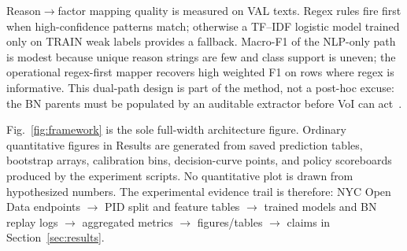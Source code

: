Reason$\rightarrow$factor mapping quality is measured on VAL texts. Regex rules fire first when high-confidence patterns match; otherwise a TF--IDF logistic model trained only on TRAIN weak labels provides a fallback. Macro-F1 of the NLP-only path is modest because unique reason strings are few and class support is uneven; the operational regex-first mapper recovers high weighted F1 on rows where regex is informative. This dual-path design is part of the method, not a post-hoc excuse: the BN parents must be populated by an auditable extractor before VoI can act~\cite{Onisko2001,Woldesenbet2016}.

Fig.~\ref{fig:framework} is the sole full-width architecture figure. Ordinary quantitative figures in Results are generated from saved prediction tables, bootstrap arrays, calibration bins, decision-curve points, and policy scoreboards produced by the experiment scripts. No quantitative plot is drawn from hypothesized numbers. The experimental evidence trail is therefore: NYC Open Data endpoints $\rightarrow$ PID split and feature tables $\rightarrow$ trained models and BN replay logs $\rightarrow$ aggregated metrics $\rightarrow$ figures/tables $\rightarrow$ claims in Section~\ref{sec:results}.
